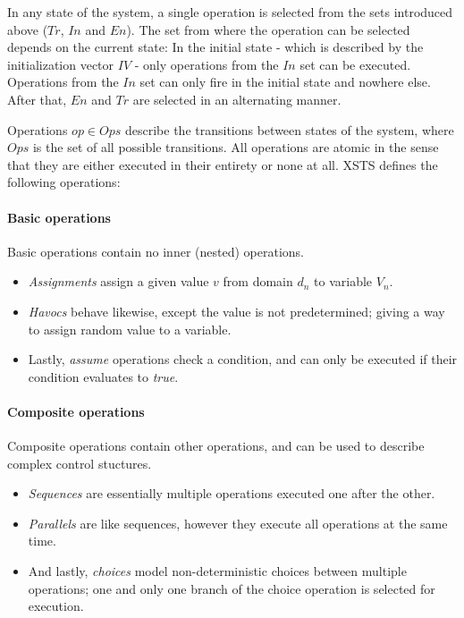 In any state of the system, a single operation is selected from the sets introduced above (\(\mathit{Tr}\), \(\mathit{In}\) and \(\mathit{En}\)). The set from where the operation can be selected depends on the current state: In the initial state - which is described by the initialization vector \(\mathit{IV}\) - only operations from the \(\mathit{In}\) set can be executed. Operations from the \(\mathit{In}\) set can only fire in the initial state and nowhere else. After that, \(\mathit{En}\) and \(\mathit{Tr}\) are selected in an alternating manner.

Operations \(\mathit{op} \in \mathit{Ops}\) describe the transitions between states of the system, where \(\mathit{Ops}\) is the set of all possible transitions. All operations are atomic in the sense that they are either executed in their entirety or none at all. XSTS defines the following operations:

\paragraph{Basic operations} 

Basic operations contain no inner (nested) operations.

\begin{itemize}
	\item \emph{Assignments} assign a given value \(v\) from domain \(d_n\) to variable \(V_n\).
	\item \emph{Havocs} behave likewise, except the value is not predetermined; giving a way to assign random value to a variable.
	\item Lastly, \emph{assume} operations check a condition, and can only be executed if their condition evaluates to \emph{true}.
\end{itemize}

\paragraph{Composite operations}

Composite operations contain other operations, and can be used to describe complex control stuctures. 

\begin{itemize}
	\item \emph{Sequences} are essentially multiple operations executed one after the other.
	\item \emph{Parallels} are like sequences, however they execute all operations at the same time.
	\item And lastly, \emph{choices} model non-deterministic choices between multiple operations; one and only one branch of the choice operation is selected for execution.
\end{itemize}

